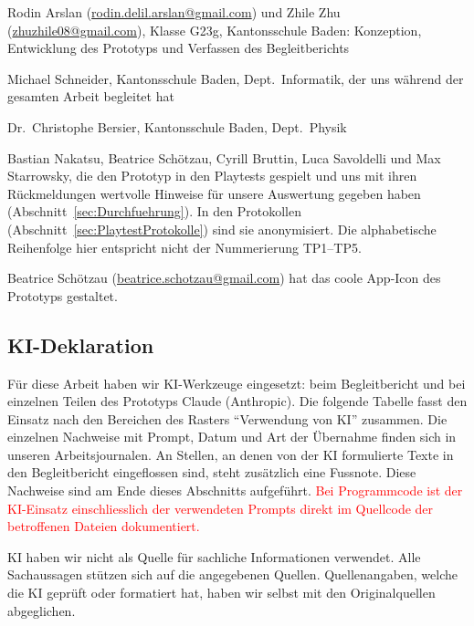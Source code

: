 \documentclass[../Main.tex]{subfiles}
\begin{document}
\begin{description}[leftmargin=1.5cm, style=nextline, itemsep=0.6em]
    \item[Projektteam] Rodin Arslan (\url{rodin.delil.arslan@gmail.com}) und Zhile Zhu (\url{zhuzhile08@gmail.com}), Klasse G23g, Kantonsschule Baden: Konzeption, Entwicklung des Prototyps und Verfassen des Begleitberichts
    \item[Erstbetreuung] Michael Schneider, Kantonsschule Baden, Dept.\ Informatik, der uns während der gesamten Arbeit begleitet hat
    \item[Zweitbewerter] Dr.\ Christophe Bersier, Kantonsschule Baden, Dept.\ Physik
    \item[Testpersonen] Bastian Nakatsu, Beatrice Schötzau, Cyrill Bruttin, Luca Savoldelli und Max Starrowsky, die den Prototyp in den Playtests gespielt und uns mit ihren Rückmeldungen wertvolle Hinweise für unsere Auswertung gegeben haben (Abschnitt~\ref{sec:Durchfuehrung}). In den Protokollen (Abschnitt~\ref{sec:PlaytestProtokolle}) sind sie anonymisiert. Die alphabetische Reihenfolge hier entspricht nicht der Nummerierung TP1--TP5.
    \item[Weitere Unterstützung] Beatrice Schötzau (\url{beatrice.schotzau@gmail.com}) hat das coole App-Icon des Prototyps gestaltet.
\end{description}

\subsection{KI-Deklaration} \label{sec:KIDeklaration}

Für diese Arbeit haben wir KI-Werkzeuge eingesetzt: beim Begleitbericht und bei einzelnen Teilen des Prototyps Claude (Anthropic). Die folgende Tabelle fasst den Einsatz nach den Bereichen des Rasters \enquote{Verwendung von KI} zusammen. Die einzelnen Nachweise mit Prompt, Datum und Art der Übernahme finden sich in unseren Arbeitsjournalen. An Stellen, an denen von der KI formulierte Texte in den Begleitbericht eingeflossen sind, steht zusätzlich eine Fussnote. Diese Nachweise sind am Ende dieses Abschnitts aufgeführt. \textcolor{red}{Bei Programmcode ist der KI-Einsatz einschliesslich der verwendeten Prompts direkt im Quellcode der betroffenen Dateien dokumentiert.}

KI haben wir nicht als Quelle für sachliche Informationen verwendet. Alle Sachaussagen stützen sich auf die angegebenen Quellen. Quellenangaben, welche die KI geprüft oder formatiert hat, haben wir selbst mit den Originalquellen abgeglichen.
\end{document}
